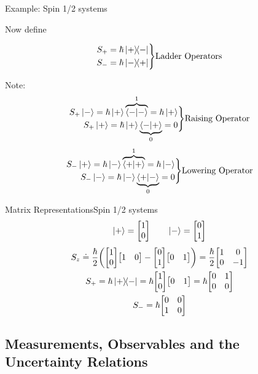 \begin{frame}{Example: Spin 1/2 systems}

	Now define

	\[
		\begin{split}
			S_+ = \hbar \op{+}{-} \\
			S_- = \hbar \op{-}{+}
		\end{split}\Biggr\} \text{Ladder Operators}
	\]

	Note:
	\[
		\begin{split}
			S_+ \ket{-} = \hbar \ket + \overbrace{\ip{-}}^1 = \hbar\ket + \\
			S_+ \ket{+} = \hbar \ket + \underbrace{\ip{-}{+}}_0 =  0      \\
		\end{split} \Biggr\} \text{Raising Operator}
	\]
	\[
		\begin{split}
			S_- \ket{+} = \hbar \ket - \overbrace{\ip{+}}^1 = \hbar\ket - \\
			S_- \ket{-} = \hbar \ket - \underbrace{\ip{+}{-}}_0 =  0      \\
		\end{split} \Biggr\} \text{Lowering Operator}
	\]

\end{frame}


\begin{frame}{Matrix Representations}{Spin 1/2 systems}
	$$\ket{+} = \mqty[1 \\ 0] \qquad \ket- = \mqty[0 \\ 1]$$
	\begin{gather*}
		S_z \doteq \frac{\hbar}{2} \pqty{\mqty[1\\0] \mqty[1 & 0] - \mqty[0 \\ 1] \mqty[0 & 1]} = \frac{\hbar}{2} \mqty[\pmat{3}]\\
		S_+ = \hbar \op{+}{-} = \hbar \mqty[1 \\ 0 ] \mqty[0 & 1] = \hbar \mqty[0 & 1\\0 & 0]\\
		S_- = \hbar \mqty[0&0\\1&0]
	\end{gather*}
\end{frame}


\subsection[Observables]{Measurements, Observables and the Uncertainty Relations}

